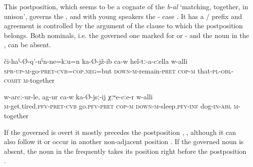 This postposition, which seems to be a cognate of the  \textit{b-al} `matching, together, in unison', governs the  , and with young speakers the - case . It has a / prefix and agreement is controlled by the  argument of the clause to which the postposition belongs. Both nominals, i.e. the governed one marked for  or - and the noun in the , can be absent.

\begin{exe}
	\ex
	\begin{xlist}
		\ex	\label{He is sitting together with them}
		\gll	či-haˁ-Ø-q'-uˁn-ne=kːu=n	ka-Ø-jž-ib	ca-w	hel-tː-a-cːella	w-alli  \\
			\textsc{spr-up}-\textsc{m}-go-\textsc{pret}-\textsc{cvb}=\textsc{cop.neg}=but	\textsc{down-m}-remain-\textsc{pret}	\textsc{cop-m}	that-\textsc{pl}-\textsc{obl}-\textsc{comit}	\textsc{m}-together\\
		\glt	{}

		\ex	\label{He went to sleep together with the dog}
		\gll	w-arcː-ur-le,	ag-ur	ca-w	ka-Ø-jsː-ij	χːʷe-cːe-r	w-alli  \\
			\textsc{m}-get.tired.\textsc{pfv}-\textsc{pret}-\textsc{cvb}	go.\textsc{pfv}-\textsc{pret}	\textsc{cop}-\textsc{m} \textsc{down-m}-sleep.\textsc{pfv}-\textsc{inf}	dog-\textsc{in}-\textsc{abl}	\textsc{m}-together\\
		\glt	{}
	\end{xlist}
\end{exe}

If the governed  is overt it mostly precedes the postposition , , although it can also follow it  or occur in another non-adjacent position . If the governed noun is absent, the noun in the  frequently takes its position right before the postposition .

